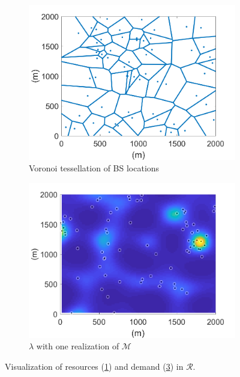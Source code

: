 \documentclass[conference]{IEEEtran}
\begin{document}
\begin{figure}[t]
	\centering
	\begin{minipage}{0.64\textwidth}
		\begin{subfigure}{.48\textwidth}
			\centering
			\includegraphics[width=0.95\linewidth]{Figures/BSLocationsVoronoi}
			\caption{Voronoi tessellation of BS locations}
			\label{fig:BSLocVor}
		\end{subfigure} \hfill
		\begin{subfigure}{.48\textwidth}
			\centering
			\includegraphics[width=0.95\linewidth]{Figures/SSLTnsPPP_demandpointreal}
			\caption{$\lambda$ with one realization of $\mathcal{M}$}
			\label{fig:SSLTDPReal}
		\end{subfigure}
		\caption{\small Visualization of resources (\cref{fig:BSLocVor}) and demand (\cref{fig:SSLTDPReal}) in $\mathcal{R}$.}

\end{minipage}
\end{figure}
\end{document}
